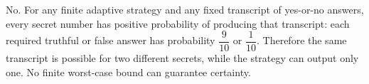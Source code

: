 No. For any finite adaptive strategy and any fixed transcript of yes-or-no answers, every secret number has positive probability of producing that transcript: each required truthful or false answer has probability $\dfrac{9}{10}$ or $\dfrac{1}{10}$. Therefore the same transcript is possible for two different secrets, while the strategy can output only one. No finite worst-case bound can guarantee certainty.
